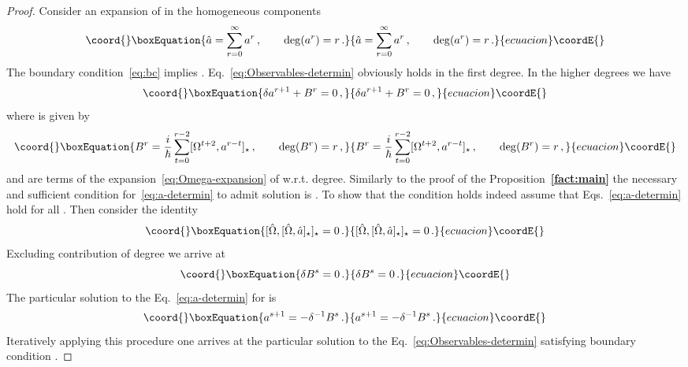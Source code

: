 \documentclass[a4paper,11pt,oneside]{amsart}
\theoremstyle{plain}
\numberwithin{equation}{section} %
\numberwithin{figure}{section} %
\providecommand{\bref}[1]{{\bf \ref{#1}}}
\providecommand{\qcommut}[2]{[#1,#2]_\star}
\renewcommand{\deg}[1]{{\rm deg}(#1)}
\begin{document}
\begin{proof}
Consider an expansion of \coordHE{} in the homogeneous components
\begin{equation}\coord{}\boxEquation{
    \label{eq:a-expuncion}
\hat a=\sum_{r=0}^\infty a^r\,,\qquad \deg{a^r}=r\,.
}{
    \hat a=\sum_{r=0}^\infty a^r\,,\qquad \deg{a^r}=r\,.
}{ecuacion}\coordE{}\end{equation}
The boundary condition~\eqref{eq:bc} implies
\coordHE{}.  Eq.~\eqref{eq:Observables-determin}
obviously holds in the first degree.  In the higher
degrees we have
\begin{equation}\coord{}\boxEquation{
  \label{eq:a-determin}
\delta a^{r+1}+B^r=0\,,
}{
  \delta a^{r+1}+B^r=0\,,
}{ecuacion}\coordE{}\end{equation}
where \coordHE{} is given by
\begin{equation}\coord{}\boxEquation{
B^r=\frac{i}{\hbar}\sum_{t=0}^{r-2}
\qcommut{\Omega^{t+2}}{a^{r-t}}\,,
\qquad
\deg{B^r}=r\,,
}{
B^r=\frac{i}{\hbar}\sum_{t=0}^{r-2}
\qcommut{\Omega^{t+2}}{a^{r-t}}\,,
\qquad
\deg{B^r}=r\,,
}{ecuacion}\coordE{}\end{equation}
and \coordHE{} are terms of the expansion~\eqref{eq:Omega-expansion}
of \myHighlight{${\hat\Omega}$}\coordHE{} w.r.t. degree.  Similarly to the proof of the
Proposition~\bref{fact:main} the necessary and sufficient condition
for~\eqref{eq:a-determin} to admit solution is \coordHE{}.  To
show that the condition holds indeed assume that
Eqs.~\eqref{eq:a-determin} hold for all \coordHE{}.  Then consider
the identity
\begin{equation}\coord{}\boxEquation{
  \qcommut{{\hat\Omega}}{\qcommut{{\hat\Omega}}{\hat a}}=0\,.
}{
  \qcommut{{\hat\Omega}}{\qcommut{{\hat\Omega}}{\hat a}}=0\,.
}{ecuacion}\coordE{}\end{equation}
Excluding contribution of degree \coordHE{} we arrive at
\begin{equation}\coord{}\boxEquation{
\delta B^s=0\,.
}{
\delta B^s=0\,.
}{ecuacion}\coordE{}\end{equation}
The particular solution to the Eq.~\eqref{eq:a-determin}
for \coordHE{} is
\begin{equation}\coord{}\boxEquation{
  a^{s+1}=-\delta^{-1}B^s\,.
}{
  a^{s+1}=-\delta^{-1}B^s\,.
}{ecuacion}\coordE{}\end{equation}
Iteratively applying this procedure one arrives at the particular
solution to the Eq.~\eqref{eq:Observables-determin} satisfying
boundary condition \coordHE{}.


\end{proof}
\end{document}
